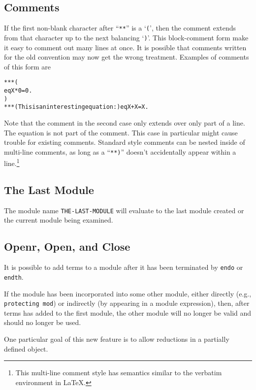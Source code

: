 \subsection{Comments}
If the first non-blank character after ``{\tt ***}'' is a `{\tt (}',
then the comment extends from that character up to the next balancing
`{\tt )}'.  This block-comment form make it easy to comment out many
lines at once.  It is possible that comments written for the old
convention may now get the wrong treatment.  Examples of comments of
this form are
\begin{alltt}
        *** (
          eq X * 0 = 0 .
        )
        *** (This is an interesting equation: )  eq X + X = X .
\end{alltt}
Note that the comment in the second case only extends over only part
of a line.  The equation is not part of the comment.  This case in
particular might cause trouble for existing comments.  Standard style
comments can be nested inside of multi-line comments, as long as a
``{\tt ***)}'' doesn't accidentally appear within a line.\footnote{This
multi-line comment style has semantics similar to the verbatim
environment in \LaTeX.}

\subsection{The Last Module}

The module name {\tt THE-LAST-MODULE} will evaluate to the last module
created or the current module being examined.

\subsection{Openr, Open, and Close}
It is possible to add terms to a module after it has been terminated
by {\tt endo} or {\tt endth}.

If the module has been incorporated into some other module, either
directly (e.g., {\tt protecting mod}) or indirectly (by appearing in a
module expression), then, after terms has added to the first module,
the other module will no longer be valid and should no longer be
used.

One particular goal of this new feature is to allow reductions in a
partially defined object.

